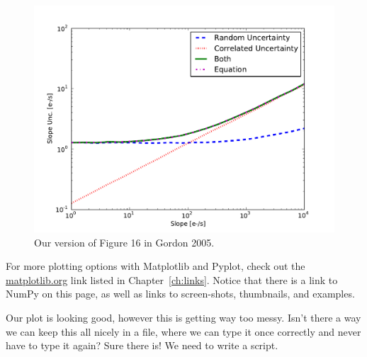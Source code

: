 \begin{figure}[tbp]
  \centering
    \includegraphics[scale=0.6]{splot_log.pdf}
    \caption{Our version of Figure 16 in Gordon 2005.}
  \label{fig:splot}
\end{figure}

For more
plotting options with Matplotlib and Pyplot, check out the 
\href{http://matplotlib.org/}{matplotlib.org} link listed in
Chapter~\ref{ch:links}.  Notice that there is a link to NumPy on this
page, as well as links to screen-shots, thumbnails, and examples.

Our plot is looking good, however this is getting way too messy.
Isn't there a way we can keep this all nicely in a file, where we can
type it once correctly and never have to type it again?  Sure there
is!  We need to write a script.
